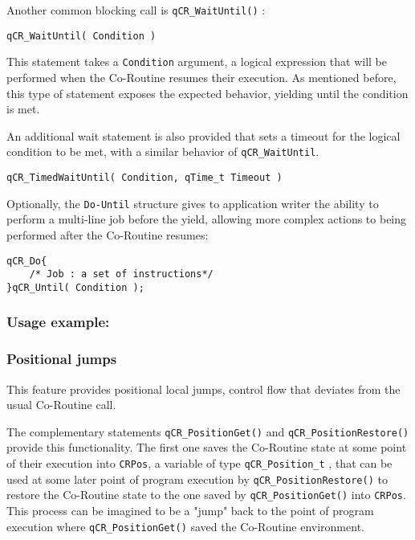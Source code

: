 Another common blocking call is \lstinline{qCR_WaitUntil()} :

\begin{lstlisting}[style=CStyle]
qCR_WaitUntil( Condition ) 
\end{lstlisting}

This statement takes a \lstinline{Condition} argument, a logical expression that will be performed when the Co-Routine resumes their execution. As mentioned before, this type of statement exposes the expected behavior, yielding until the condition is met.
\medskip

An additional wait statement is also provided that sets a timeout for the logical condition to be met, with a similar behavior of \lstinline{qCR_WaitUntil}. 
\medskip

\begin{lstlisting}[style=CStyle]
qCR_TimedWaitUntil( Condition, qTime_t Timeout )
\end{lstlisting}

Optionally, the \lstinline{Do-Until}   structure gives to application writer the ability to perform a multi-line job before the yield, allowing more complex actions to being performed after the Co-Routine resumes: 
\medskip

\begin{lstlisting}[style=CStyle]
qCR_Do{
    /* Job : a set of instructions*/
}qCR_Until( Condition );
\end{lstlisting}

\subsubsection*{Usage example:}


\subsubsection{Positional jumps}
This feature provides positional local jumps, control flow that deviates from the usual Co-Routine call. 

The complementary statements \lstinline{qCR_PositionGet()}  and \lstinline{qCR_PositionRestore()}  provide this functionality.
The first one saves the Co-Routine state at some point of their execution into \lstinline{CRPos}, a variable of type \lstinline{qCR_Position_t} ,  that can be used at some later point of program execution by \lstinline{qCR_PositionRestore()} to restore the Co-Routine  state to the one saved by \lstinline{qCR_PositionGet()} into \lstinline{CRPos}. This process can be imagined to be a "jump" back to the point of program execution where \lstinline{qCR_PositionGet()} saved the Co-Routine  environment.
\medskip

